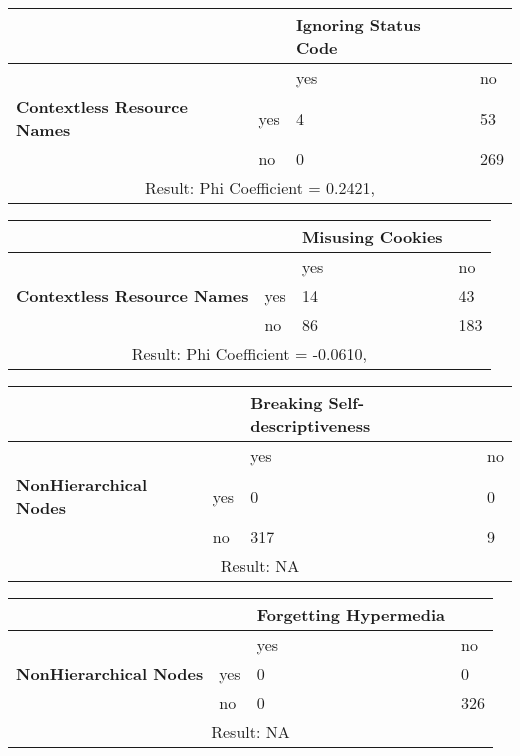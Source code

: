 \documentclass[a4paper,12pt]{article}
\begin{document}
\begin{center}
  \begin{tabular}{| p{60mm} | p{10mm} | p{35mm} | p{35mm} |}
  \hline
   & & \textbf{Ignoring Status Code} &
  \\
  \hline
  & & yes & no
  \\
  \hline
  \textbf{Contextless Resource Names} & yes & 4 & 53
  \\
  \hline
   & no & 0 & 269
  \\
  \hline
  \multicolumn{4}{|c|}{Result: Phi Coefficient = 0.2421, }
  \\ \hline
  \end{tabular}
  \end{center}

\begin{center}
  \begin{tabular}{| p{60mm} | p{10mm} | p{35mm} | p{35mm} |}
  \hline
   & & \textbf{Misusing Cookies} &
  \\
  \hline
  & & yes & no
  \\
  \hline
  \textbf{Contextless Resource Names} & yes & 14 & 43
  \\
  \hline
   & no & 86 & 183
  \\
  \hline
  \multicolumn{4}{|c|}{Result: Phi Coefficient = -0.0610, }
  \\ \hline
  \end{tabular}
  \end{center}

\begin{center}
  \begin{tabular}{| p{60mm} | p{10mm} | p{35mm} | p{35mm} |}
  \hline
   & & \textbf{Breaking Self-descriptiveness} &
  \\
  \hline
  & & yes & no
  \\
  \hline
  \textbf{NonHierarchical Nodes} & yes & 0 & 0
  \\
  \hline
   & no & 317 & 9
  \\
  \hline
  \multicolumn{4}{|c|}{Result: NA}
  \\ \hline
  \end{tabular}
  \end{center}

\begin{center}
  \begin{tabular}{| p{60mm} | p{10mm} | p{35mm} | p{35mm} |}
  \hline
   & & \textbf{Forgetting Hypermedia} &
  \\
  \hline
  & & yes & no
  \\
  \hline
  \textbf{NonHierarchical Nodes} & yes & 0 & 0
  \\
  \hline
   & no & 0 & 326
  \\
  \hline
  \multicolumn{4}{|c|}{Result: NA}
  \\ \hline
  \end{tabular}
  \end{center}
\end{document}
